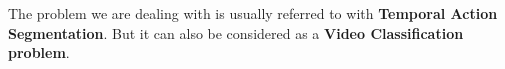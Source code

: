 
\begin{frame}
    The problem we are dealing with is usually referred to with \textbf{Temporal Action Segmentation}. But it can also be considered as a \textbf{Video Classification problem}.
\end{frame}